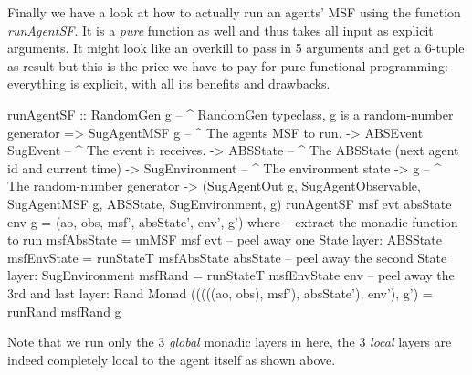 Finally we have a look at how to actually run an agents' MSF using the function \textit{runAgentSF}. It is a \textit{pure} function as well and thus takes all input as explicit arguments. It might look like an overkill to pass in 5 arguments and get a 6-tuple as result but this is the price we have to pay for pure functional programming: everything is explicit, with all its benefits and drawbacks.

\begin{HaskellCode}
runAgentSF :: RandomGen g        -- ^ RandomGen typeclass, g is a random-number generator
           => SugAgentMSF g      -- ^ The agents MSF to run.
           -> ABSEvent SugEvent  -- ^ The event it receives.
           -> ABSState           -- ^ The ABSState (next agent id and current time)
           -> SugEnvironment     -- ^ The environment state
           -> g                  -- ^ The random-number generator
           -> (SugAgentOut g, SugAgentObservable, SugAgentMSF g, ABSState, SugEnvironment, g)
runAgentSF msf evt absState env g = (ao, obs, msf', absState', env', g') 
  where
    -- extract the monadic function to run
    msfAbsState = unMSF msf evt
    -- peel away one State layer: ABSState
    msfEnvState = runStateT msfAbsState absState
    -- peel away the second State layer: SugEnvironment
    msfRand     = runStateT msfEnvState env
    -- peel away the 3rd and last layer: Rand Monad
    (((((ao, obs), msf'), absState'), env'), g') = runRand msfRand g
\end{HaskellCode}

Note that we run only the 3 \textit{global} monadic layers in here, the 3 \textit{local} layers are indeed completely local to the agent itself as shown above.